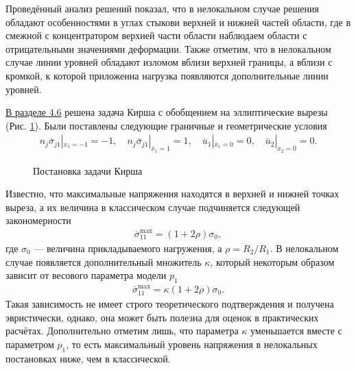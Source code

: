 Проведённый анализ решений показал, что в нелокальном случае решения обладают особенностями в углах стыкови верхней и нижней частей области, где в смежной с концентратором верхней части области наблюдаем области с отрицательными значениями деформации. Также отметим, что в нелокальном случае линии уровней обладают изломом вблизи верхней границы, а вблизи с кромкой, к которой приложенна нагрузка появляются дополнительные линии уровней.

\underline{В разделе 4.6} решена задача Кирша с обобщением на эллиптические вырезы (Рис. \ref{fig:KirshProblem}). Были поставлены следующие граничные и геометрические условия
\begin{gather*}
	n_j \overline{\sigma}_{j1} |_{\overline{x}_1 = -1} = -1,
	\quad
	n_j \overline{\sigma}_{j1} |_{\overline{x}_1 = 1} = 1,
	\quad
	\overline{u}_1 |_{\overline{x}_1 = 0} = 0,
	\quad
	\overline{u}_2 |_{\overline{x}_2 = 0} = 0.
\end{gather*}

\begin{figure}[ht]
    \caption{Постановка задачи Кирша}
    \label{fig:KirshProblem}
\end{figure}

Известно, что максимальные напряжения находятся в верхней и нижней точках выреза, а их величина в классическом случае подчиняется следующей закономерности
\begin{gather*}
	\overline{\sigma}_{11}^{\max} = \left( 1 + 2 \rho \right) \sigma_0,
\end{gather*}
где $\sigma_0$ --- величина прикладываемого нагружения, а $\rho = R_2 / R_1$. В нелокальном случае появляется дополнительный множитель $\kappa$, который некоторым образом зависит от весового параметра модели $p_1$
 \begin{gather*}
	\overline{\sigma}_{11}^{\max} = \kappa \left( 1 + 2 \rho \right) \sigma_0.
\end{gather*}
Такая зависимость не имеет строго теоретического подтверждения и получена эвристически, однако, она может быть полезна для оценок в практических расчётах. Дополнительно отметим лишь, что параметра $\kappa$ уменьшается вместе с параметром $p_1$, то есть максимальный уровень напряжения в нелокальных постановках ниже, чем в классической.

